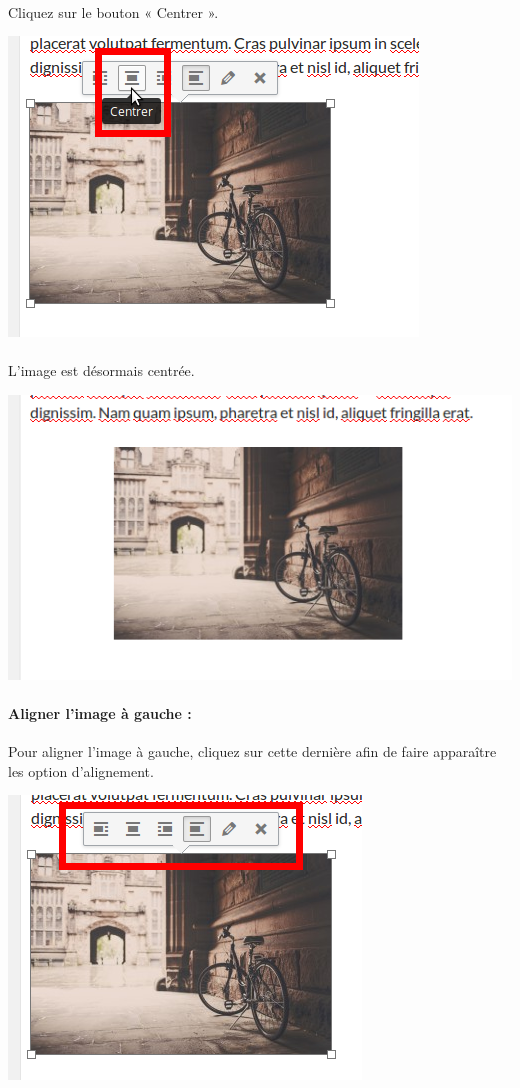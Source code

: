 \documentclass[10pt,a4paper]{article}
\begin{document}
\paragraph{}Cliquez sur le bouton « Centrer ».
\begin{center}
\includegraphics[scale=0.3]{img/0108.png}
\end{center}
\paragraph{}L'image est désormais centrée.
\begin{center}
\includegraphics[scale=0.3]{img/0109.png}
\end{center}
\paragraph{Aligner l'image à gauche : }Pour aligner l'image à gauche, cliquez sur cette dernière afin de faire apparaître les option d'alignement.
\begin{center}
\includegraphics[scale=0.3]{img/0107.png}
\end{center}
\end{document}

